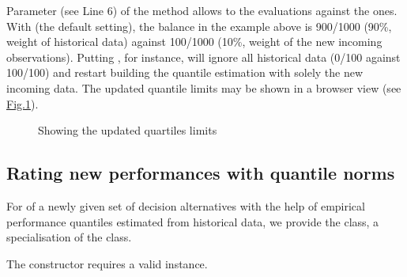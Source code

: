 \documentclass[a4paper,12pt,english]{sphinxhowto}
\let\sphinxpxdimen\pdfpxdimen\else\newdimen\sphinxpxdimen
\begin{document}
Parameter  (see Line 6) of the  method allows to  the  evaluations against the  ones. With  (the default setting), the balance in the example above is 900/1000 (90\%, weight of historical data) against 100/1000 (10\%, weight of the new incoming observations). Putting , for instance, will ignore all historical data (0/100 against 100/100) and restart building the quantile estimation with solely the new incoming data. The updated quantile limits may be shown in a browser view (see \hyperref[\detokenize{tutorial:exampleperfquantiles}]{Fig.\@ \ref{\detokenize{tutorial:exampleperfquantiles}}}).

\begin{sphinxVerbatim}[commandchars=\\\{\},numbers=left,firstnumber=1,stepnumber=1]
\end{sphinxVerbatim}

\begin{figure}[H]
\centering
\capstart

\noindent\sphinxincludegraphics[width=400\sphinxpxdimen]{{examplePerfQuantiles}.png}
\caption{Showing the updated quartiles limits}\label{\detokenize{tutorial:exampleperfquantiles}}\end{figure}


\subsection{Rating new performances with quantile norms}
\label{\detokenize{tutorial:rating-new-performances-with-quantile-norms}}
For  of a newly given set of decision alternatives with the help of empirical performance quantiles estimated from historical data, we provide the  class, a specialisation of the  class.

The constructor requires a valid  instance.
\end{document}
